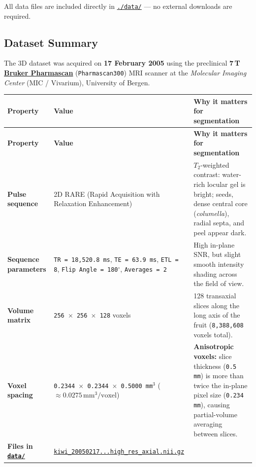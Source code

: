 \documentclass[10pt,a4paper]{article}
\newcommand{\ghblob}{https://github.com/arvidl/BMED365-2027/blob/main}
\newcommand{\ghtree}{https://github.com/arvidl/BMED365-2027/tree/main}
\begin{document}
All data files are included directly in \href{\ghtree/Lab4-Comp-Imag/Kiwi-challenge/data}{\texttt{./data/}} --- no external downloads are required.

\subsection{Dataset Summary}

The 3D dataset was acquired on \textbf{17 February 2005} using the preclinical \textbf{7\,T \href{https://www.bruker.com/en/products-and-solutions/preclinical-imaging/mri/pharmascan-new.html}{Bruker Pharmascan}} (\texttt{Pharmascan300}) MRI scanner at the \textit{Molecular Imaging Center} (MIC / Vivarium), University of Bergen.

{\footnotesize
\renewcommand{\arraystretch}{1.28}
\begin{xltabular}{\textwidth}{L{2.55cm} L{5.35cm} Y}
\toprule
{}\textbf{Property} & \textbf{Value} & \textbf{Why it matters for segmentation} \\
\midrule
\endfirsthead
\toprule
{}\textbf{Property} & \textbf{Value} & \textbf{Why it matters for segmentation} \\
\midrule
\endhead
\bottomrule
\endfoot
\textbf{Pulse sequence} &
2D RARE (Rapid Acquisition with Relaxation Enhancement) &
$T_2$-weighted contrast: water-rich locular gel is bright; seeds, dense central core (\textit{columella}), radial septa, and peel appear dark. \\
\textbf{Sequence parameters} &
\texttt{TR = 18,520.8\,ms}, \texttt{TE = 63.9\,ms}, \texttt{ETL = 8}, \texttt{Flip Angle = 180$^\circ$}, \texttt{Averages = 2} &
High in-plane SNR, but slight smooth intensity shading across the field of view. \\
\textbf{Volume matrix} &
\texttt{256 $\times$ 256 $\times$ 128} voxels &
128 transaxial slices along the long axis of the fruit (\texttt{8,388,608} voxels total). \\
\textbf{Voxel spacing} &
\texttt{0.2344 $\times$ 0.2344 $\times$ 0.5000\,mm$^3$} ($\approx 0.0275\,\text{mm}^3/\text{voxel}$) &
\textbf{Anisotropic voxels:} slice thickness (\texttt{0.5\,mm}) is more than twice the in-plane pixel size (\texttt{0.234\,mm}), causing partial-volume averaging between slices. \\
\textbf{Files in \href{\ghtree/Lab4-Comp-Imag/Kiwi-challenge/data}{\texttt{data/}}} &
\href{\ghblob/Lab4-Comp-Imag/Kiwi-challenge/data/kiwi_20050217191129_131073_RARE_high_res_axial.nii.gz}{\texttt{kiwi\_20050217...high\_res\_axial.nii.gz}}\newline

\end{xltabular}}
\end{document}
